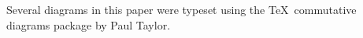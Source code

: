 \documentclass[12pt]{article}
\theoremstyle{plain}
\theoremstyle{definition}
\theoremstyle{remark}
\newcommand{\Z}{\mathbb{Z}}
\newcommand{\mc}[1]{\mathcal{#1}}
\begin{document}
\begin{comment}
So if we write the generators of $H^2_\Gamma(\amalg(U_a-L_a))$ as $x_a$ and choose consistent co-orientations, we see that, possibly up to a universal sign, $j(\underline{\hat \gamma_{ab}}) = x_a - x_b$.
Now let us order our indexing set $A$ and relabel $A = \{1, \ldots , n\}$.
We then have that the set $\mc G = \{\underline{\hat \gamma_{i,i+1}}\}_{i=1}^{n-1}$ maps onto the set $\{x_i-x_{i+1}\}_{i=1}^{n-1}$, which spans a subgroups of $H^2_\Gamma(\amalg(U_a-L_a))$ such that the quotient is $\Z$.
Thus the elements of $\mc G$ generate $H^2_\Gamma(M) \cong \Z^{n-1}$.
We also see from the exact sequence that $\underline{\hat \gamma_{i,i+1}}+\underline{\hat \gamma_{i+1,i+2}} = \underline{\hat \gamma_{i, i+2}}$, as their difference maps to $0$, but $j$ is injective.
More generally, $\underline{\hat \gamma_{i,i+1}} + \cdots + \underline{\hat \gamma_{i+k-1, i+k}} =\underline{\hat \gamma_{i,i+k}}$.

So, in summary, the generators of $H^1_\Gamma(M)$ can be represented by Seifert surfaces, while the elements of $H^2_\gamma(M)$ can be realized as arcs between neighboring components, subject to the above relations.

Of course the real power of geometric cohomology is that we can also derive consequences for the \emph{ring} $H^*_\Gamma(M)$ from geometry.
For example, if it is possible to choose Seifert surfaces $S_a$ simultaneously that are disjoint or intersect only in closed curves, then all cup product on $H^1_\Gamma(M)$ vanish.
On the other hand, if two Seifert surfaces $S_a$ and $S_b$ intersect in just an arc between $L_a$ and $L_b$, then this corresponds to the cup product of two generators of $H^1_\Gamma(M)$ being a generator of $H^2_\Gamma(M)$.
\end{comment}





















Several diagrams in this paper were typeset using the \TeX\, commutative
diagrams package by Paul Taylor.
\end{document}
